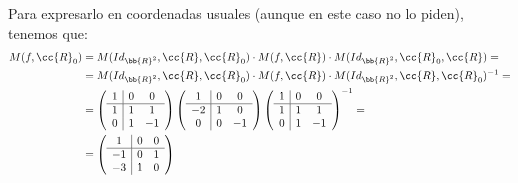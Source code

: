 \begin{ejercicio}
    Para expresarlo en coordenadas usuales (aunque en este caso no lo piden), tenemos que:
    \begin{equation*}
        \begin{split}
            M(f,\cc{R}_0) &= M(Id_{\bb{R}^2}, \cc{R}, \cc{R}_0) \cdot M(f,\cc{R}) \cdot M(Id_{\bb{R}^2}, \cc{R}_0, \cc{R}) =\\
            &= M(Id_{\bb{R}^2}, \cc{R}, \cc{R}_0) \cdot M(f,\cc{R}) \cdot M(Id_{\bb{R}^2}, \cc{R}, \cc{R}_0)^{-1} =\\
            &=\left(\begin{array}{c|cc}
                1 & 0 & 0 \\ \hline
                1 & 1 & 1 \\
                0 & 1 & -1
            \end{array}\right)
            \left(\begin{array}{c|cc}
                1 & 0 & 0 \\ \hline
                -2 & 1 & 0 \\
                0 & 0 & -1
            \end{array}\right)
            \left(\begin{array}{c|cc}
                1 & 0 & 0 \\ \hline
                1 & 1 & 1 \\
                0 & 1 & -1
            \end{array}\right)^{-1} =\\
            &= \left(\begin{array}{c|cc}
                1 & 0 & 0 \\ \hline
                -1 & 0 & 1 \\
                -3 & 1 & 0
            \end{array}\right)
        \end{split}
    \end{equation*}
\end{ejercicio}

